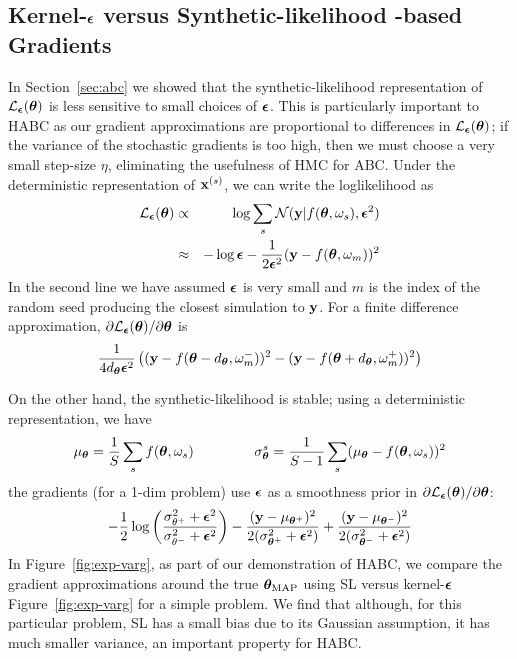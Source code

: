 \documentclass[]{article}
\begin{document}
\subsection{Kernel-${\bm {\epsilon}}$ versus Synthetic-likelihood -based Gradients}\label{sec:habc-grads}
In Section~\ref{sec:abc} we showed that the synthetic-likelihood representation of $\mathcal{L}_{{\bm {\epsilon}}}({\bm \theta})$ is less sensitive to small choices of ${\bm {\epsilon}}$.  This is particularly important to HABC as our gradient approximations are proportional to differences in $\mathcal{L}_{{\bm {\epsilon}}}({\bm \theta})$; if the variance of the stochastic gradients is too high, then we must choose a very small step-size $\eta$, eliminating the usefulness of HMC for ABC.  Under the deterministic representation of ${\bf x}^{(s)}$, we can write the loglikelihood as
\begin{eqnarray}
 \mathcal{L}_{{\bm {\epsilon}}}({\bm \theta}) & \propto & \log \sum_s \mathcal{N}( {\bf y} | f( {\bm \theta}, \omega_s), {\bm {\epsilon}}^2 )\\
                 & \approx & -\log {\bm {\epsilon}} -\frac{1}{2 {\bm {\epsilon}}^2} ( {\bf y} - f( {\bm \theta}, \omega_m) )^2 
\end{eqnarray}
In the second line we have assumed ${\bm {\epsilon}}$ is very small and $m$ is the index of the random seed producing the closest simulation to ${\bf y}$.  For a finite difference approximation, $\partial \mathcal{L}_{{\bm {\epsilon}}}({\bm \theta})/\partial{\bm \theta}$ is
\begin{equation}
 \frac{1}{4d_{{\bm \theta}} {\bm {\epsilon}}^2} \left( ( {\bf y} - f( {\bm \theta}-d_{{\bm \theta}}, \omega_m^-) )^2 -( {\bf y} - f( {\bm \theta} + d_{{\bm \theta}}, \omega_m^+) )^2 \right)
\end{equation}

On the other hand, the synthetic-likelihood is stable; using a deterministic representation, we have 
\begin{equation}
\mu_{{\bm \theta}} = \frac{1}{S} \sum_s f( {\bm \theta}, \omega_s ) ~~~~~~~~~~~~~ \sigma^s_{{\bm \theta}} = \frac{1}{S-1} \sum_s ( \mu_{{\bm \theta}} - f( {\bm \theta}, \omega_s ) )^2
\end{equation}
the gradients (for a 1-dim problem) use ${\bm {\epsilon}}$ as a smoothness prior in $\partial \mathcal{L}_{{\bm {\epsilon}}}({\bm \theta})/\partial{\bm \theta}$:
\begin{equation}
  -\frac{1}{2}\log\left(\frac{\sigma_{\theta^+}^2 + {\bm {\epsilon}}^2}{\sigma_{\theta^-}^2 + {\bm {\epsilon}}^2}\right) -\frac{( {\bf y} - \mu_{{\bm \theta}^+} )^2 }{2 (\sigma^2_{{\bm \theta}^+} + {\bm {\epsilon}}^2 )} +\frac{( {\bf y} - \mu_{{\bm \theta}^-} )^2 }{2 (\sigma^2_{{\bm \theta}^-} + {\bm {\epsilon}}^2 )} 
\end{equation} 
In Figure~\ref{fig:exp-varg}, as part of our demonstration of HABC, we compare the gradient approximations around the true ${\bm \theta}_{\text{MAP}}$ using SL versus kernel-${\bm {\epsilon}}$ Figure~\ref{fig:exp-varg} for a simple problem.  We find that although, for this particular problem, SL has a small bias due to its Gaussian assumption, it has much smaller variance, an important property for HABC.
\end{document}
